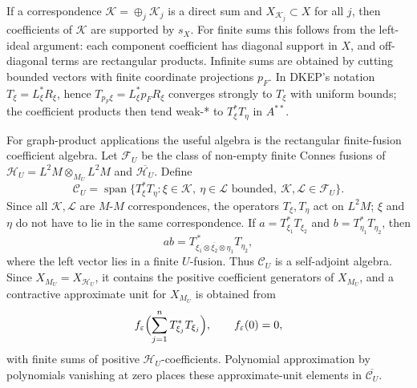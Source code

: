 \documentclass{article}
\begin{document}
If a correspondence \(\mathcal K=\oplus_j \mathcal K_j\) is a direct sum and
\(X_{\mathcal K_j}\subset X\) for all \(j\), then coefficients of \(\mathcal K\)
are supported by \(s_X\).  For finite sums this follows from the left-ideal
argument: each component coefficient has diagonal support in \(X\), and
off-diagonal terms are rectangular products.  Infinite sums are obtained by
cutting bounded vectors with finite coordinate projections \(p_F\).  In DKEP's
notation \(T_\xi=L_\xi^*R_\xi\), hence \(T_{p_F\xi}=L_\xi^*p_FR_\xi\) converges
strongly to \(T_\xi\) with uniform bounds; the coefficient products then tend
weak-* to \(T_\xi^*T_\eta\) in \(A^{**}\).

For graph-product applications the useful algebra is the rectangular
finite-fusion coefficient algebra.  Let \(\mathcal F_U\) be the class of
non-empty finite Connes fusions of
\(\mathcal H_U=L^2M\otimes_{M_U}L^2M\) and \(\overline{\mathcal H_U}\).  Define
\[
 \mathcal C_U=\operatorname{span}\{T_\xi^*T_\eta:
    \xi\in\mathcal K,\ \eta\in\mathcal L \text{ bounded},\
    \mathcal K,\mathcal L\in\mathcal F_U\}.
\]
Since all \(\mathcal K,\mathcal L\) are \(M\)-\(M\) correspondences, the
operators \(T_\xi,T_\eta\) act on \(L^2M\); \(\xi\) and \(\eta\) do not have to
lie in the same correspondence.  If
\(a=T_{\xi_1}^*T_{\xi_2}\) and \(b=T_{\eta_1}^*T_{\eta_2}\), then
\[
        ab
        =T_{\xi_1\otimes\overline{\xi_2}\otimes\eta_1}^{\,*}T_{\eta_2},
\]
where the left vector lies in a finite \(U\)-fusion.  Thus \(\mathcal C_U\) is a
self-adjoint algebra.  Since \(X_{M_U}=X_{\mathcal H_U}\), it contains the
positive coefficient generators of \(X_{M_U}\), and a contractive approximate
unit for \(X_{M_U}\) is obtained from
\[
 f_\varepsilon\Bigl(\sum_{j=1}^n T_{\xi_j}^*T_{\xi_j}\Bigr),\qquad
 f_\varepsilon(0)=0,
\]
with finite sums of positive \(\mathcal H_U\)-coefficients.  Polynomial
approximation by polynomials vanishing at zero places these approximate-unit
elements in \(\overline{\mathcal C_U}\).
\end{document}
